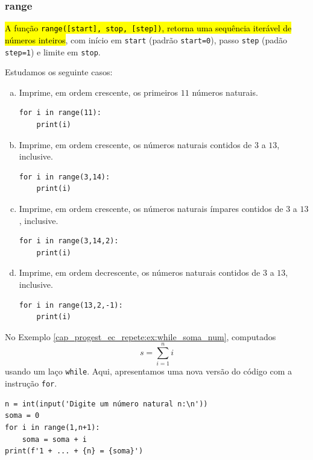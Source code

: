 \subsubsection{range}

\hl{A função \texttt{range([start], stop, [step])}, retorna uma sequência iterável de números inteiros}, com início em \lstinline+start+ (padrão \lstinline+start=0+), passo \lstinline+step+ (padão \lstinline+step=1+) e limite em \lstinline+stop+.

\begin{ex}
  Estudamos os seguinte casos:
  \begin{enumerate}[a)]
  \item Imprime, em ordem crescente, os primeiros $11$ números naturais.

\begin{lstlisting}
for i in range(11):
    print(i)
\end{lstlisting}

\item Imprime, em ordem crescente, os números naturais contidos de $3$ a $13$, inclusive.

\begin{lstlisting}
for i in range(3,14):
    print(i)
\end{lstlisting}

\item Imprime, em ordem crescente, os números naturais ímpares contidos de $3$ a $13$, inclusive.

\begin{lstlisting}
for i in range(3,14,2):
    print(i)
\end{lstlisting}

\item Imprime, em ordem decrescente, os números naturais contidos de $3$ a $13$, inclusive.

\begin{lstlisting}
for i in range(13,2,-1):
    print(i)
\end{lstlisting}

\end{enumerate}

\end{ex}

\begin{ex}\label{cap_progest_ec_repete:ex:for_soma_num}
  No Exemplo \ref{cap_progest_ec_repete:ex:while_soma_num}, computados
  \begin{equation}
    s = \sum_{i=1}^n i
  \end{equation}
  usando um laço \lstinline+while+. Aqui, apresentamos uma nova versão do código com a instrução \lstinline+for+.

\begin{lstlisting}
n = int(input('Digite um número natural n:\n'))
soma = 0
for i in range(1,n+1):
    soma = soma + i
print(f'1 + ... + {n} = {soma}')
\end{lstlisting}

\end{ex}

